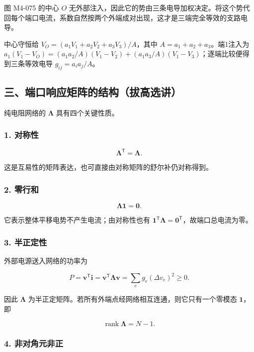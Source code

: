 图 M4-075 的中心 \(O\)
无外部注入，因此它的势由三条电导加权决定。将这个势代回每个端口电流，系数自然按两个外端成对出现，这才是三端完全等效的支路电导。

中心守恒给 \(V_O=(a_1V_1+a_2V_2+a_3V_3)/A\)，其中
\(A=a_1+a_2+a_3\)。端1注入为
\(a_1(V_1-V_O)=(a_1a_2/A)(V_1-V_2)+(a_1a_3/A)(V_1-V_3)\)；逐端比较便得到三条等效电导
\(g_{ij}=a_ia_j/A\)。

\subsection{三、端口响应矩阵的结构（拔高选讲）}\label{m4:ux4e09ux7aefux53e3ux54cdux5e94ux77e9ux9635ux7684ux7ed3ux6784ux62d4ux9ad8ux9009ux8bb2}

纯电阻网络的 \(\boldsymbol\Lambda\) 具有四个关键性质。

\subsubsection{1. 对称性}\label{m4:ux5bf9ux79f0ux6027}

\[
\boldsymbol\Lambda^{\mathsf T}=\boldsymbol\Lambda.
\]

这是互易性的矩阵表达，也可直接由对称矩阵的舒尔补仍对称得到。

\subsubsection{2. 零行和}\label{m4:ux96f6ux884cux548c}

\[
\boldsymbol\Lambda\boldsymbol 1=\boldsymbol 0.
\]

它表示整体平移电势不产生电流；由对称性也有
\(\boldsymbol 1^{\mathsf T}\boldsymbol\Lambda=\boldsymbol 0^{\mathsf T}\)，故端口总电流为零。

\subsubsection{3. 半正定性}\label{m4:ux534aux6b63ux5b9aux6027}

外部电源送入网络的功率为

\[
P=\boldsymbol v^{\mathsf T}\boldsymbol i
=\boldsymbol v^{\mathsf T}\boldsymbol\Lambda\boldsymbol v
=\sum_{e}g_e(\Delta v_e)^2\ge0.
\]

因此 \(\boldsymbol\Lambda\)
为半正定矩阵。若所有外端点经网络相互连通，则它只有一个零模态
\(\boldsymbol 1\)，即

\[
\operatorname{rank}\boldsymbol\Lambda=N-1.
\]

\subsubsection{4.
非对角元非正}\label{m4:ux975eux5bf9ux89d2ux5143ux975eux6b63}


